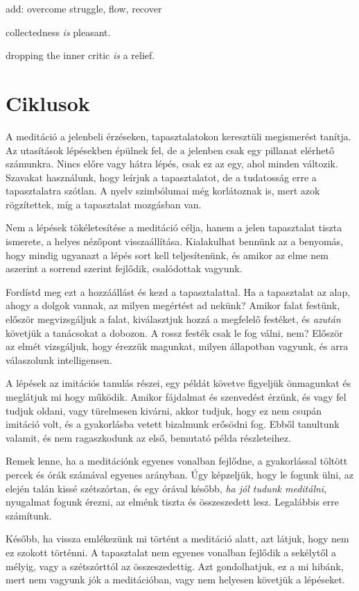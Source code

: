 add: overcome struggle, flow, recover

collectedness \emph{is} pleasant.

dropping the inner critic \emph{is} a relief.

\hypertarget{ciklusok-1}{%
\chapter{Ciklusok}\label{ciklusok-1}}

A meditáció a jelenbeli érzéseken, tapasztalatokon keresztüli
megismerést tanítja. Az utasítások lépésekben épülnek fel, de a jelenben
csak egy pillanat elérhető számunkra. Nincs előre vagy hátra lépés, csak
ez az egy, ahol minden változik. Szavakat használunk, hogy leírjuk a
tapasztalatot, de a tudatosság erre a tapasztalatra szótlan. A nyelv
szimbólumai még korlátoznak is, mert azok rögzítettek, míg a tapasztalat
mozgásban van.

Nem a lépések tökéletesítése a meditáció célja, hanem a jelen
tapasztalat tiszta ismerete, a helyes nézőpont visszaállítása.
Kialakulhat bennünk az a benyomás, hogy mindig ugyanazt a lépés sort
kell teljesítenünk, és amikor az elme nem aszerint a sorrend szerint
fejlődik, csalódottak vagyunk.

Fordístd meg ezt a hozzáállást és kezd a tapasztalattal. Ha a
tapasztalat az alap, ahogy a dolgok vannak, az milyen megértést ad
nekünk? Amikor falat festünk, először megvizsgáljuk a falat,
kiválasztjuk hozzá a megfelelő festéket, és \emph{azután} követjük a
tanácsokat a dobozon. A rossz festék csak le fog válni, nem? Először az
elmét vizsgáljuk, hogy érezzük magunkat, milyen állapotban vagyunk, és
arra válaszolunk intelligensen.

A lépések az imitációs tanulás részei, egy példát követve figyeljük
önmagunkat és meglátjuk mi hogy működik. Amikor fájdalmat és szenvedést
érzünk, és vagy fel tudjuk oldani, vagy türelmesen kivárni, akkor
tudjuk, hogy ez nem csupán imitáció volt, és a gyakorlásba vetett
bizalmunk erősödni fog. Ebből tanultunk valamit, és nem ragaszkodunk az
első, bemutató példa részleteihez.

Remek lenne, ha a meditációnk egyenes vonalban fejlődne, a gyakorlással
töltött percek és órák számával egyenes arányban. Úgy képzeljük, hogy le
fogunk ülni, az elején talán kissé szétszórtan, és egy órával később,
\emph{ha jól tudunk meditálni}, nyugalmat fogunk érezni, az elménk
tiszta és összeszedett lesz. Legalábbis erre számítunk.

Később, ha vissza emlékezünk mi történt a meditáció alatt, azt látjuk,
hogy nem ez szokott történni. A tapasztalat nem egyenes vonalban
fejlődik a sekélytől a mélyig, vagy a szétszórttól az összeszedettig.
Azt gondolhatjuk, ez a mi hibánk, mert nem vagyunk jók a meditációban,
vagy nem helyesen követjük a lépéseket.

